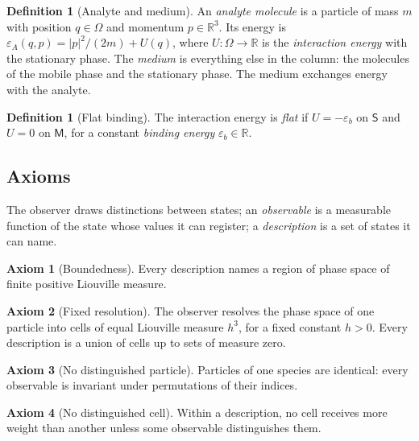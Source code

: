 \documentclass[11pt,a4paper]{article}
\theoremstyle{definition}
\newtheorem{definition}[theorem]{Definition}
\newtheorem{axiom}{Axiom}
\theoremstyle{remark}
\newcommand{\R}{\mathbb{R}}
\newcommand{\Mob}{\mathsf{M}}
\newcommand{\Sta}{\mathsf{S}}
\begin{document}
\begin{definition}[Analyte and medium]
\label{def:analyte}
An \emph{analyte molecule} is a particle of mass $m$ with position $q\in\Omega$ and momentum $p\in\R^{3}$.
Its energy is $\varepsilon_A(q,p)=|p|^{2}/(2m)+U(q)$, where $U\colon\Omega\to\R$ is the \emph{interaction energy} with the stationary phase.
The \emph{medium} is everything else in the column: the molecules of the mobile phase and the stationary phase.
The medium exchanges energy with the analyte.
\end{definition}

\begin{definition}[Flat binding]
\label{def:flat}
The interaction energy is \emph{flat} if $U=-\varepsilon_b$ on $\Sta$ and $U=0$ on $\Mob$, for a constant \emph{binding energy} $\varepsilon_b\in\R$.
\end{definition}

\subsection{Axioms}

The observer draws distinctions between states; an \emph{observable} is a measurable function of the state whose values it can register; a \emph{description} is a set of states it can name.

\begin{axiom}[Boundedness]
\label{ax:bounded}
Every description names a region of phase space of finite positive Liouville measure.
\end{axiom}

\begin{axiom}[Fixed resolution]
\label{ax:resolution}
The observer resolves the phase space of one particle into cells of equal Liouville measure $h^{3}$, for a fixed constant $h>0$.
Every description is a union of cells up to sets of measure zero.
\end{axiom}

\begin{axiom}[No distinguished particle]
\label{ax:labels}
Particles of one species are identical: every observable is invariant under permutations of their indices.
\end{axiom}

\begin{axiom}[No distinguished cell]
\label{ax:cells}
Within a description, no cell receives more weight than another unless some observable distinguishes them.
\end{axiom}
\end{document}
